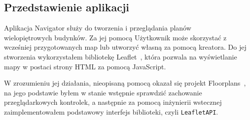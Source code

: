 \subsection{Przedstawienie aplikacji}

Aplikacja Navigator służy do tworzenia i przeglądania planów\\%
wielopiętrowych budynków.
Za jej pomocą Użytkownik może skorzystać z wcześniej przygotowanych map lub utworzyć własną za pomocą kreatora.
Do jej stworzenia wykorzystałem bibliotekę Leaflet~\cite{leafletGithub}, 
która pozwala na wyświetlanie mapy w postaci strony HTML za pomocą JavaScript.

W zrozumieniu jej działania, nieopisaną pomocą okazał się projekt Floorplans~\cite{floorplansGithub},
na jego podstawie byłem w stanie wstępnie sprawdzić zachowanie przeglądarkowych kontrolek, 
a następnie za pomocą inżynierii wstecznej zaimplementowałem podstawowy interfejs biblioteki, 
czyli \verb|LeafletAPI|.